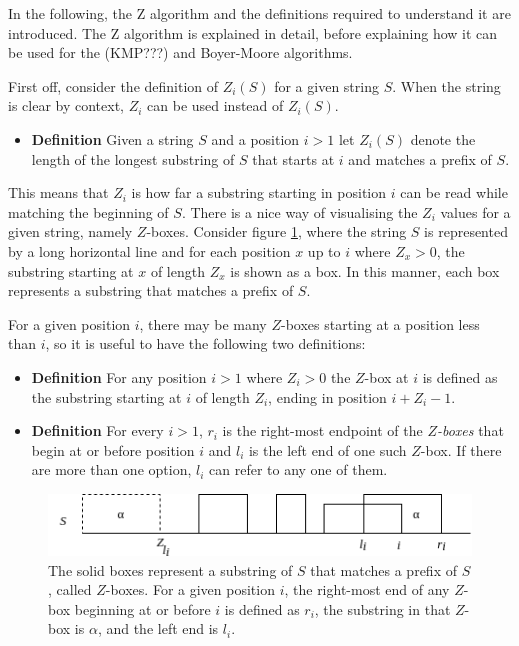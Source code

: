 In the following, the Z algorithm and the definitions required to understand it are introduced. The Z algorithm is explained in detail, before explaining how it can be used for the (KMP???) and Boyer-Moore algorithms. 

First off, consider the definition of $Z_i(S)$ for a given string $S$. When the string is clear by context, $Z_i$ can be used instead of $Z_i(S)$. 

\begin{itemize}
    \item[] \textbf{Definition} Given a string $S$ and a position $i>1$ let $Z_i(S)$ denote the length of the longest substring of $S$ that starts at $i$ and matches a prefix of $S$. 
\end{itemize}

This means that $Z_i$ is how far a substring starting in position $i$ can be read while matching the beginning of $S$. There is a nice way of visualising the $Z_i$ values for a given string, namely $Z$-boxes. Consider figure \ref{fig:z_boxes}, where the string $S$ is represented by a long horizontal line and for each position $x$ up to $i$ where $Z_x>0$, the substring starting at $x$ of length $Z_x$ is shown as a box. In this manner, each box represents a substring that matches a prefix of $S$. 

For a given position $i$, there may be many $Z$-boxes starting at a position less than $i$, so it is useful to have the following two definitions:

\begin{itemize}
    \item[] \textbf{Definition} For any position $i>1$ where $Z_i>0$ the $Z$-box at $i$ is defined as the substring starting at $i$ of length $Z_i$, ending in position $i+Z_i-1$. 
    \item[] \textbf{Definition} For every $i>1$, $r_i$ is the right-most endpoint of the \textit{$Z$-boxes} that begin at or before position $i$ and $l_i$ is the left end of one such $Z$-box. If there are more than one option, $l_i$ can refer to any one of them. 
\end{itemize}

\begin{figure}[t]
    \centering
    \includegraphics[width=.9\textwidth]{LaTeX/Figures/Zalg/zboxes.png}
    \caption{The solid boxes represent a substring of $S$ that matches a prefix of $S$, called $Z$-boxes. For a given position $i$, the right-most end of any $Z$-box beginning at or before $i$ is defined as $r_i$, the substring in that $Z$-box is $\alpha$, and the left end is $l_i$. }
    \label{fig:z_boxes}
\end{figure}

